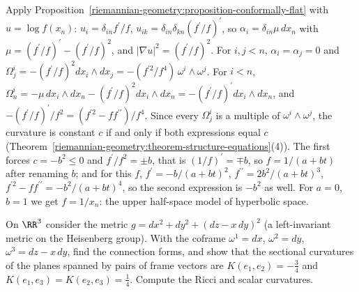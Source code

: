 \begin{solution}
Apply Proposition~\ref{riemannian-geometry:proposition-conformally-flat} with $u = \log f(x_n)$: $u_i = \delta_{in}f^{\prime}/f$, $u_{ik} = \delta_{in}\delta_{kn}(f^{\prime}/f)^{\prime}$, so
$\alpha_i = \delta_{in}\mu\,dx_n$ with $\mu = (f^{\prime}/f)^{\prime} - (f^{\prime}/f)^2$, and $|\nabla u|^2 = (f^{\prime}/f)^2$. For $i, j < n$, $\alpha_i = \alpha_j = 0$ and
$\Omega^i_j = -(f^{\prime}/f)^2dx_i \wedge dx_j = -(f^{\prime2}/f^4)\,\omega^i \wedge \omega^j$. For $i < n$, $\Omega^i_n = -\mu\,dx_i \wedge dx_n - (f^{\prime}/f)^2dx_i \wedge dx_n = -(f^{\prime}/f)^{\prime}dx_i \wedge dx_n$, and
$-(f^{\prime}/f)^{\prime}/f^2 = (f^{\prime2} - ff^{\prime\prime})/f^4$. Since every $\Omega^i_j$ is a multiple of $\omega^i \wedge \omega^j$, the curvature is constant $c$ if and only if both expressions equal
$c$ (Theorem~\ref{riemannian-geometry:theorem-structure-equations}(4)). The first forces $c = -b^2 \leq 0$ and $f^{\prime}/f^2 = \pm b$, that is $(1/f)^{\prime} = \mp b$, so $f = 1/(a + bt)$ after renaming
$b$; and for this $f$, $f^{\prime} = -b/(a + bt)^2$, $f^{\prime\prime} = 2b^2/(a + bt)^3$, $f^{\prime2} - ff^{\prime\prime} = -b^2/(a + bt)^4$, so the second expression is $-b^2$ as well. For $a = 0$, $b = 1$ we get
$f = 1/x_n$: the upper half-space model of hyperbolic space.
\end{solution}

\begin{exercise}\label{riemannian-geometry:exercise-heisenberg}
On $\RR^3$ consider the metric $g = dx^2 + dy^2 + (dz - x\,dy)^2$ (a left-invariant metric on the Heisenberg group). With the coframe $\omega^1 = dx$, $\omega^2 = dy$, $\omega^3 = dz - x\,dy$, find the
connection forms, and show that the sectional curvatures of the planes spanned by pairs of frame vectors are $K(e_1, e_2) = -\frac34$ and $K(e_1, e_3) = K(e_2, e_3) = \frac14$. Compute the Ricci and
scalar curvatures.
\end{exercise}

